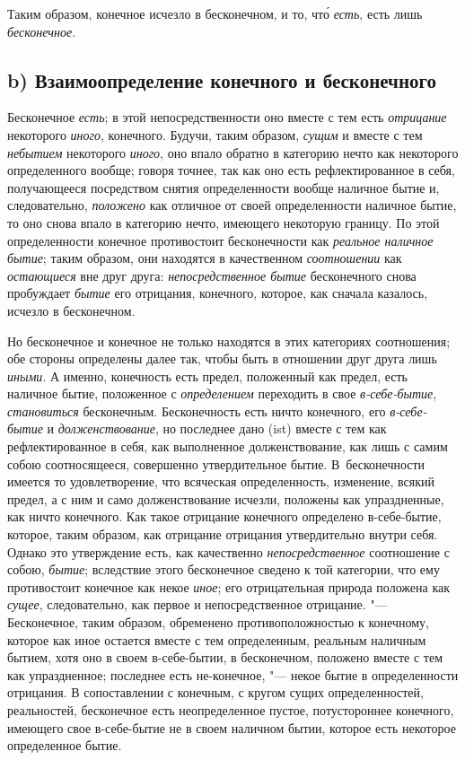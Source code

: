 Таким образом, конечное исчезло в бесконечном,
и то, чт\'{о} {\em есть}, есть лишь {\em бесконечное}.

\subsection[b) Взаимоопределение конечного и бесконечного]%
  {b) Взаимоопределение конечного и бесконечного}
Бесконечное {\em есть}; в этой непосредственности оно
вместе с тем есть {\em отрицание} некоторого
{\em иного}, конечного. Будучи, таким образом,
{\em сущим} и вместе с тем {\em небытием} некоторого
{\em иного}, оно впало обратно в категорию нечто как
некоторого определенного вообще; говоря точнее, так как оно есть
рефлектированное в себя, получающееся посредством снятия определенности
вообще наличное бытие и, следовательно, {\em положено}
как отличное от своей определенности наличное бытие, то оно снова впало в
категорию нечто, имеющего некоторую границу. По этой определенности
конечное противостоит бесконечности как {\em реальное
наличное бытие}; таким образом, они находятся в качественном
{\em соотношении} как
{\em остающиеся} вне друг друга:
{\em непосредственное бытие} бесконечного снова
пробуждает {\em бытие} его отрицания, конечного,
которое, как сначала казалось, исчезло в бесконечном.

Но бесконечное и конечное не только находятся в этих категориях соотношения;
обе стороны определены далее так, чтобы быть в отношении друг друга лишь
{\em иными}. А именно, конечность есть предел,
положенный как предел, есть наличное бытие, положенное с
{\em определением} переходить в свое
{\em в-себе-бытие},
{\em становиться} бесконечным. Бесконечность есть ничто
конечного, его {\em в-себе-бытие} и
{\em долженствование}, но последнее дано (ist) вместе с
тем как рефлектированное в себя, как выполненное долженствование, как лишь
с самим собою соотносящееся, совершенно утвердительное бытие.
В~бесконечности имеется то удовлетворение, что всяческая определенность,
изменение, всякий предел, а с ним и само долженствование исчезли, положены
как упраздненные, как ничто конечного. Как такое отрицание конечного
определено в-себе-бытие, которое, таким образом, как отрицание отрицания
утвердительно внутри себя. Однако это утверждение есть, как качественно
{\em непосредственное} соотношение с собою,
{\em бытие}; вследствие этого бесконечное сведено к той
категории, что ему противостоит конечное как некое
{\em иное}; его отрицательная природа положена как
{\em сущее}, следовательно, как первое и
непосредственное отрицание. "--- Бесконечное, таким образом, обременено
противоположностью к конечному, которое как иное остается вместе с тем
определенным, реальным наличным бытием, хотя оно в своем в-себе-бытии, в
бесконечном, положено вместе с тем как упраздненное; последнее есть
не-конечное, "--- некое бытие в определенности отрицания. В сопоставлении с
конечным, с кругом сущих определенностей, реальностей, бесконечное есть
неопределенное пустое, потустороннее конечного, имеющего свое в-себе-бытие
не в своем наличном бытии, которое есть некоторое определенное бытие.

